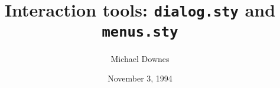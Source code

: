 %

\title{Interaction tools: {\tt dialog.sty} and {\tt menus.sty}}
\author{Michael Downes}
\date{November 3, 1994}

\def\ensuremath#1{\ifmmode #1\else $#1$\fi\relax}


\renewcommand{\thepart}{\arabic{part}}
\renewcommand{\thesection}{\thepart.\arabic{section}}

\def\PrintMacroName#1{}
%

\setlength{\MacroIndent}{0pt}
\def\MacroFont{\verbatimfont}% doc.sty uses \MacroFont

\DontCheckModules

\multicoldefaultlayout

\jobswitch %
\maketitle
\thispagestyle{empty}

